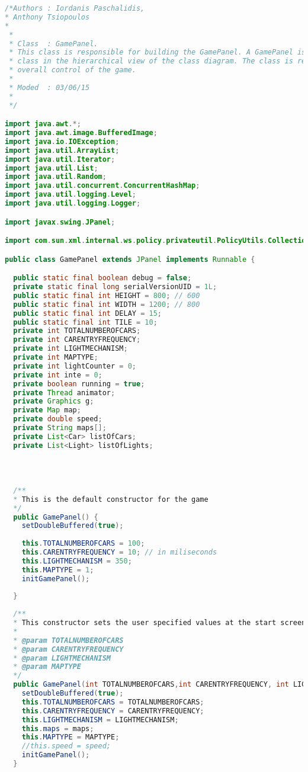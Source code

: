 \begin{lstlisting}[language=java]
/*Authors : Iordanis Paschalidis, 
* Anthony Tsiopoulos 
* 
 * 
 * Class  : GamePanel.
 * This class is responsible for building the GamePanel. A GamePanel is the immediate
 * class in the hierarchical view of the class diagram. The class is responsible for the 
 * overall control of the game. 
 * 
 * Moded  : 03/06/15
 * 
 */

import java.awt.*;
import java.awt.image.BufferedImage;
import java.io.IOException;
import java.util.ArrayList;
import java.util.Iterator;
import java.util.List;
import java.util.Random;
import java.util.concurrent.ConcurrentHashMap;
import java.util.logging.Level;
import java.util.logging.Logger;

import javax.swing.JPanel;

import com.sun.xml.internal.ws.policy.privateutil.PolicyUtils.Collections;

public class GamePanel extends JPanel implements Runnable {

  public static final boolean debug = false;
  private static final long serialVersionUID = 1L;
  public static final int HEIGHT = 800; // 600
  public static final int WIDTH = 1200; // 800
  public static final int DELAY = 15;
  public static final int TILE = 10;
  private int TOTALNUMBEROFCARS;
  private int CARENTRYFREQUENCY;
  private int LIGHTMECHANISM; 
  private int MAPTYPE;
  private int lightCounter = 0;
  private int inte = 0;
  private boolean running = true;
  private Thread animator;
  private Graphics g;
  private Map map;
  private double speed; 
  private String maps[];
  private List<Car> listOfCars;
  private List<Light> listOfLights; 
  
  
   

  /**
  * This is the default constructor for the game 
  */
  public GamePanel() {
    setDoubleBuffered(true);
    
    this.TOTALNUMBEROFCARS = 100; 
    this.CARENTRYFREQUENCY = 10; // in miliseconds 
    this.LIGHTMECHANISM = 350; 
    this.MAPTYPE = 1; 
    initGamePanel();
    
  }
  
  /**
  * This constructor sets the user specified values at the start screen
  *  
  * @param TOTALNUMBEROFCARS
  * @param CARENTRYFREQUENCY
  * @param LIGHTMECHANISM
  * @param MAPTYPE
  */
  public GamePanel(int TOTALNUMBEROFCARS,int CARENTRYFREQUENCY, int LIGHTMECHANISM, String []maps,int MAPTYPE,double speed) {
    setDoubleBuffered(true);
    this.TOTALNUMBEROFCARS = TOTALNUMBEROFCARS; 
    this.CARENTRYFREQUENCY = CARENTRYFREQUENCY; 
    this.LIGHTMECHANISM = LIGHTMECHANISM; 
    this.maps = maps; 
    this.MAPTYPE = MAPTYPE; 
    //this.speed = speed; 
    initGamePanel();
  }
  

\end{lstlisting}
